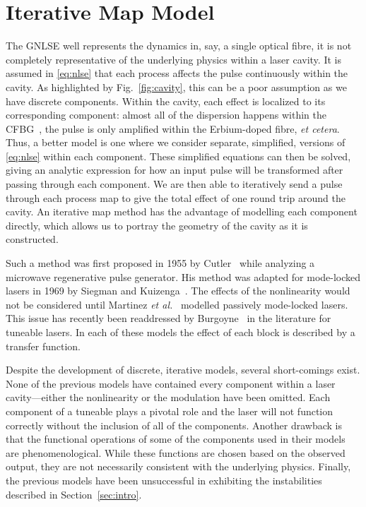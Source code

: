 \documentclass[9pt,twocolumn,twoside]{osajnl}
\begin{document}
\section{Iterative Map Model}
\label{sec:model}
The GNLSE well represents the dynamics in, say, a single optical fibre, it is not completely representative of the underlying physics within a laser cavity. It is assumed in \eqref{eq:nlse} that each process affects the pulse continuously within the cavity. As highlighted by Fig.~\ref{fig:cavity}, this can be a poor assumption as we have discrete components. Within the cavity, each effect is localized to its corresponding component: almost all of the dispersion happens within the CFBG~\cite{agrawal2002}, the pulse is only amplified within the Erbium-doped fibre, \emph{et cetera}. Thus, a better model is one where we consider separate, simplified, versions of \eqref{eq:nlse} within each component. These simplified equations can then be solved, giving an analytic expression for how an input pulse will be transformed after passing through each component. We are then able to iteratively send a pulse through each process map to give the total effect of one round trip around the cavity. An iterative map method has the advantage of modelling each component directly, which allows us to portray the geometry of the cavity as it is constructed.

Such a method was first proposed in 1955 by Cutler~\cite{cutler1955} while analyzing a microwave regenerative pulse generator. His method was adapted for mode-locked lasers in 1969 by Siegman and Kuizenga~\cite{kuizenga1970a, kuizenga1970b, kuizenga1970, siegman1969}. The effects of the nonlinearity would not be considered until Martinez \emph{et al.}~\cite{martinez1984, martinez1985} modelled passively mode-locked lasers. This issue has recently been readdressed by Burgoyne~\cite{burgoyne2014} in the literature for tuneable lasers. In each of these models the effect of each block is described by a transfer function.

Despite the development of discrete, iterative models, several short-comings exist. None of the previous models have contained every component within a laser cavity---either the nonlinearity or the modulation have been omitted. Each component of a tuneable plays a pivotal role and the laser will not function correctly without the inclusion of all of the components. Another drawback is that the functional operations of some of the components used in their models are phenomenological. While these functions are chosen based on the observed output, they are not necessarily consistent with the underlying physics. Finally, the previous models have been unsuccessful in exhibiting the instabilities described in Section~\ref{sec:intro}.
\end{document}
